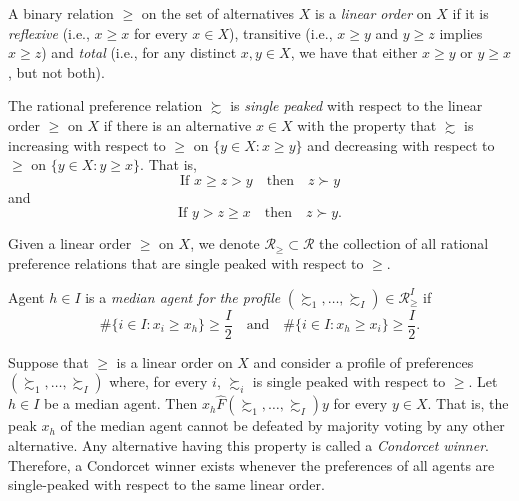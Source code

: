 \begin{defn}
    A binary relation $\geq$ on the set of alternatives $X$ is a \emph{linear order} on $X$ if it is \emph{reflexive} (i.e., $x \geq x$ for every $x \in X$), transitive (i.e., $x \geq y$ and $y \geq z$ implies $x \geq z$) and \emph{total} (i.e., for any distinct $x, y \in X$, we have that either $x \geq y$ or $y \geq x$, but not both).
\end{defn}

\begin{defn}
    The rational preference relation $\succsim$ is \emph{single peaked} with respect to the linear order $\geq$ on $X$ if there is an alternative $x \in X$ with the property that $\succsim$ is increasing with respect to $\geq$ on $\{y \in X : x \geq y\}$ and decreasing with respect to $\geq$ on $\{y \in X : y \geq x\}$. That is,
    \begin{equation*}
        \text{If } x \geq z > y \quad \text{then} \quad z \succ y
    \end{equation*}
    and
    \begin{equation*}
        \text{If } y > z \geq x \quad \text{then} \quad z \succ y.
    \end{equation*}
\end{defn}

\begin{defn}
    Given a linear order $\geq$ on $X$, we denote $\mathscr{R}_\geq \subset \mathscr{R}$ the collection of all rational preference relations that are single peaked with respect to $\geq$.
\end{defn}

\begin{defn}
    Agent $h \in I$ is a \emph{median agent for the profile} $(\succsim_1, \dots, \succsim_I) \in \mathscr{R}_\geq^I$ if 
    \begin{equation*}
        \# \{i \in I : x_i \geq x_h\} \geq \frac{I}{2} \quad \text{and} \quad \# \{i \in I : x_h \geq x_i\} \geq \frac{I}{2}.
    \end{equation*}
\end{defn}

\begin{prop}
    Suppose that $\geq$ is a linear order on $X$ and consider a profile of preferences $(\succsim_1, \dots, \succsim_I)$ where, for every $i$, $\succsim_i$ is single peaked with respect to $\geq$. Let $h \in I$ be a median agent. Then $x_h \hat{F} (\succsim_1, \dots, \succsim_I) y$ for every $y \in X$. That is, the peak $x_h$ of the median agent cannot be defeated by majority voting by any other alternative. Any alternative having this property is called a \emph{Condorcet winner}. Therefore, a Condorcet winner exists whenever the preferences of all agents are single-peaked with respect to the same linear order.
\end{prop}

